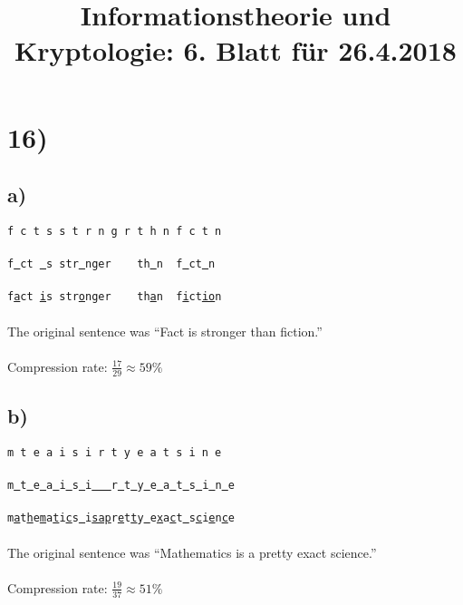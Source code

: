 %



  \title{Informationstheorie und Kryptologie: 6. Blatt für 26.4.2018}
  \maketitle

  \section*{16)}

  \subsection*{a)}

  \texttt{f c t s s t r n g r t h n f c t n} \\
  \\
  \texttt{f\underline{\ }ct \underline{\ }s str\underline{\ }nger\ \ \ \ th\underline{\ }n\ \ f\underline{\ }ct\underline{\ }n} \\
  \\
  \texttt{f\underline{a}ct \underline{i}s str\underline{o}nger\ \ \ \ th\underline{a}n\ \ f\underline{i}ct\underline{io}n} \\
  \\
  The original sentence was “Fact is stronger than fiction.” \\
  \\
  Compression rate: $\frac{17}{29} \approx 59\% $

  \subsection*{b)}

  \texttt{m t e a i s i \textvisiblespace \textvisiblespace r t y e a t s i n e} \\
  \\
  \texttt{m\underline{\ }t\underline{\ }e\underline{\ }a\underline{\ }i\underline{\ }s\underline{\ }i\underline{\ }\textvisiblespace\underline{\ }\textvisiblespace\underline{\ }r\underline{\ }t\underline{\ }y\underline{\ }e\underline{\ }a\underline{\ }t\underline{\ }s\underline{\ }i\underline{\ }n\underline{\ }e} \\
  \\
  \texttt{m\underline{a}t\underline{h}e\underline{m}a\underline{t}i\underline{c}s\underline{\ }i\underline{s}\textvisiblespace\underline{a}\textvisiblespace\underline{p}r\underline{e}t\underline{t}y\underline{\ }e\underline{x}a\underline{c}t\underline{\ }s\underline{c}i\underline{e}n\underline{c}e} \\
  \\
  The original sentence was “Mathematics is a pretty exact science.” \\
  \\
  Compression rate: $\frac{19}{37} \approx 51\% $

